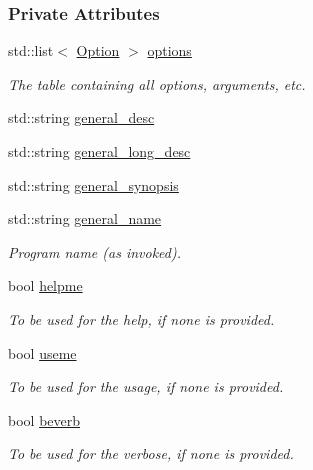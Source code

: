\subsubsection*{Private Attributes}
\begin{DoxyCompactItemize}
\item 
std::list$<$ \hyperlink{classpoptmx_1_1Option}{Option} $>$ \hyperlink{classpoptmx_1_1OptionTable_aaeb4410c92cd7d688b2b41821403d6ef}{options}
\begin{DoxyCompactList}\small\item\em The table containing all options, arguments, etc. \item\end{DoxyCompactList}\item 
std::string \hyperlink{classpoptmx_1_1OptionTable_a0bfb132b39096093f9809dbd0b06ac31}{general\_\-desc}
\item 
std::string \hyperlink{classpoptmx_1_1OptionTable_a7168462caaba6b939fd66148a4b2715b}{general\_\-long\_\-desc}
\item 
std::string \hyperlink{classpoptmx_1_1OptionTable_aa68f1825e50e20f036ec9abfdb0e4a24}{general\_\-synopsis}
\item 
std::string \hyperlink{classpoptmx_1_1OptionTable_af3cea70107b7b4f19b1fe61232e3e1d8}{general\_\-name}
\begin{DoxyCompactList}\small\item\em Program name (as invoked). \item\end{DoxyCompactList}\item 
bool \hyperlink{classpoptmx_1_1OptionTable_aed7f2317e288f87f851e6f78d16bc734}{helpme}
\begin{DoxyCompactList}\small\item\em To be used for the help, if none is provided. \item\end{DoxyCompactList}\item 
bool \hyperlink{classpoptmx_1_1OptionTable_aa3aab8995cf0a39e49946c7993d11d76}{useme}
\begin{DoxyCompactList}\small\item\em To be used for the usage, if none is provided. \item\end{DoxyCompactList}\item 
bool \hyperlink{classpoptmx_1_1OptionTable_a7e3eec8a2c01e6cbe0d7584bfd6d563b}{beverb}
\begin{DoxyCompactList}\small\item\em To be used for the verbose, if none is provided. \item\end{DoxyCompactList}\item 

\end{DoxyCompactItemize}

